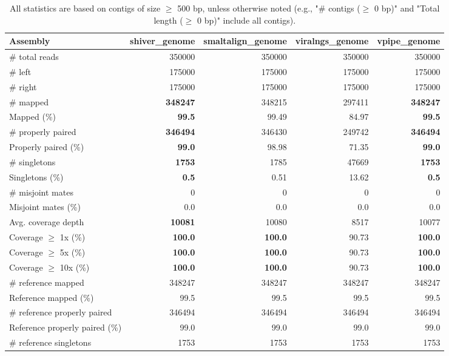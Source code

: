\documentclass[12pt,a4paper]{article}
\begin{document}
\begin{table}[ht]
\begin{center}
\caption{All statistics are based on contigs of size $\geq$ 500 bp, unless otherwise noted (e.g., "\# contigs ($\geq$ 0 bp)" and "Total length ($\geq$ 0 bp)" include all contigs).}
\begin{tabular}{|l*{4}{|r}|}
\hline
Assembly & shiver\_genome & smaltalign\_genome & viralngs\_genome & vpipe\_genome \\ \hline
\# total reads & 350000 & 350000 & 350000 & 350000 \\ \hline
\# left & 175000 & 175000 & 175000 & 175000 \\ \hline
\# right & 175000 & 175000 & 175000 & 175000 \\ \hline
\# mapped & {\bf 348247} & 348215 & 297411 & {\bf 348247} \\ \hline
Mapped (\%) & {\bf 99.5} & 99.49 & 84.97 & {\bf 99.5} \\ \hline
\# properly paired & {\bf 346494} & 346430 & 249742 & {\bf 346494} \\ \hline
Properly paired (\%) & {\bf 99.0} & 98.98 & 71.35 & {\bf 99.0} \\ \hline
\# singletons & {\bf 1753} & 1785 & 47669 & {\bf 1753} \\ \hline
Singletons (\%) & {\bf 0.5} & 0.51 & 13.62 & {\bf 0.5} \\ \hline
\# misjoint mates & 0 & 0 & 0 & 0 \\ \hline
Misjoint mates (\%) & 0.0 & 0.0 & 0.0 & 0.0 \\ \hline
Avg. coverage depth & {\bf 10081} & 10080 & 8517 & 10077 \\ \hline
Coverage $\geq$ 1x (\%) & {\bf 100.0} & {\bf 100.0} & 90.73 & {\bf 100.0} \\ \hline
Coverage $\geq$ 5x (\%) & {\bf 100.0} & {\bf 100.0} & 90.73 & {\bf 100.0} \\ \hline
Coverage $\geq$ 10x (\%) & {\bf 100.0} & {\bf 100.0} & 90.73 & {\bf 100.0} \\ \hline
\# reference mapped & 348247 & 348247 & 348247 & 348247 \\ \hline
Reference mapped (\%) & 99.5 & 99.5 & 99.5 & 99.5 \\ \hline
\# reference properly paired & 346494 & 346494 & 346494 & 346494 \\ \hline
Reference properly paired (\%) & 99.0 & 99.0 & 99.0 & 99.0 \\ \hline
\# reference singletons & 1753 & 1753 & 1753 & 1753 \\ \hline

\end{tabular}
\end{center}
\end{table}
\end{document}
